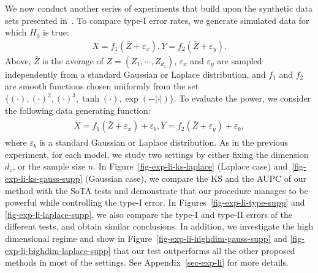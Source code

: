 We now conduct another series of experiments that build upon the synthetic data sets presented in~\citep{zhang2012kernel,li2020nonparametric,doran2014permutation,BellotS19}.
To compare type-I error rates, we generate simulated data for which $H_0$ is true:
\begin{align}
\label{li-exp-h0}
X=f_1\left(\bar{Z}+\varepsilon_x\right),Y=f_2\left(\bar{Z}+\varepsilon_y\right).
\end{align}
Above, $\bar{Z}$ is the average of $Z=(Z_1,\cdots,Z_{d_z})$, $\varepsilon_x$ and $\varepsilon_y$ are sampled independently from a standard Gaussian or Laplace distribution, and $f_1$ and $f_2$ are smooth
functions chosen uniformly from the set $\{(\cdot), (\cdot)^2, (\cdot)^3, \tanh(\cdot), \exp(-|\cdot|)\}$. To evaluate the power, we consider the following data generating function:
\begin{align}
\begin{aligned}
\label{li-exp-h1}
 X=f_1\left( \bar{Z}+\varepsilon_x\right)+\varepsilon_b,Y=f_2\left(\bar{Z}+\varepsilon_y\right)+\varepsilon_b,
\end{aligned}
\end{align}
where $\varepsilon_b$ is a standard Gaussian or Laplace distribution. 
As in the previous experiment, for each model, we study two settings by either fixing the dimension $d_z$, or the sample size $n$. In Figure~\ref{fig-exp-li-ks-laplace} (Laplace case) and~\ref{fig-exp-li-ks-gauss-supp} (Gaussian case), we compare the KS and the AUPC of our method with the SoTA tests and demonstrate that our procedure manages to be powerful while controlling the type-I error. In Figures~\ref{fig-exp-li-type-supp} and \ref{fig-exp-li-laplace-supp}, we also compare the type-I and type-II errors of the different tests, and obtain similar conclusions. In addition, we investigate the high dimensional regime and show in Figure~\ref{fig-exp-li-highdim-gauss-supp} and \ref{fig-exp-li-highdim-laplace-supp} that our test outperforms all the other proposed methods in most of the settings. See Appendix~\ref{sec-exp-li} for more details.



